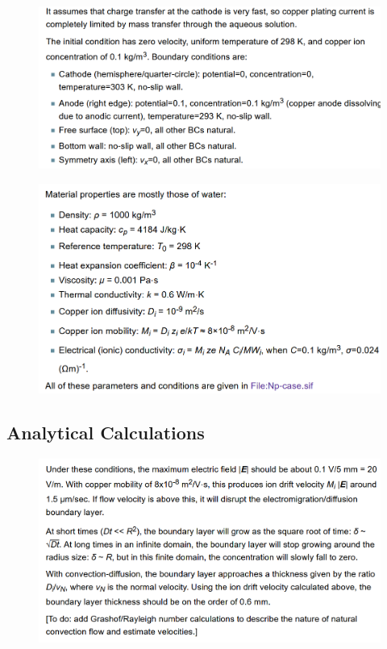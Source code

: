 \begin{figure}[H]
\centering
\includegraphics[width=1.0\textwidth]{ec-23}
\end{figure}

\begin{figure}[H]
\centering
\includegraphics[width=1.0\textwidth]{ec-24}
\end{figure}

\subsection{Analytical Calculations}

\begin{figure}[H]
\centering
\includegraphics[width=1.0\textwidth]{ec-25}
\end{figure}

